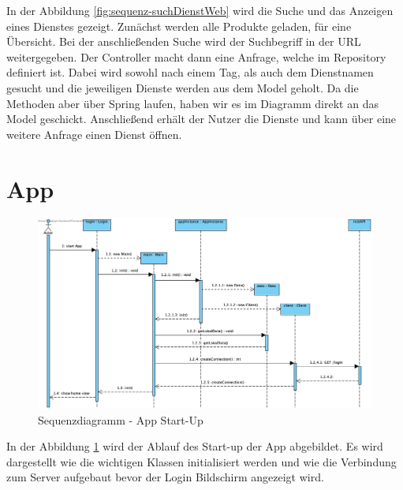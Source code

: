 In der Abbildung \ref{fig:sequenz-suchDienstWeb} wird die Suche und das Anzeigen eines Dienstes gezeigt. Zunächst werden alle Produkte geladen, für eine Übersicht.
Bei der anschließenden Suche wird der Suchbegriff in der URL weitergegeben.
Der Controller macht dann eine Anfrage, welche im Repository definiert ist.
Dabei wird sowohl nach einem Tag, als auch dem Dienstnamen gesucht und die jeweiligen Dienste werden aus dem Model geholt.
Da die Methoden aber über Spring laufen, haben wir es im Diagramm direkt an das Model geschickt.
Anschließend erhält der Nutzer die Dienste und kann über eine weitere Anfrage einen Dienst öffnen.


\section{App}
\begin{figure}[h]
	\centering
	\includegraphics[keepaspectratio,width=\textwidth]{sequenzdiagramm/AppStartUp}
	\caption{Sequenzdiagramm - App Start-Up}
	\label{fig:sequenz-appstartup}
\end{figure}
\FloatBarrier
In der Abbildung \ref{fig:sequenz-appstartup} wird der Ablauf des Start-up der App abgebildet. Es wird dargestellt wie die wichtigen Klassen initialisiert werden und wie die Verbindung zum Server aufgebaut bevor der Login Bildschirm angezeigt wird.

